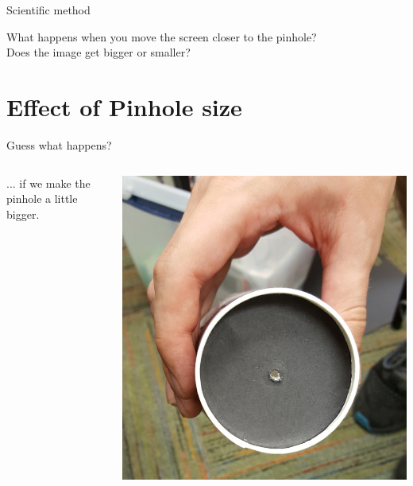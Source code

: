 \begin{frame}[fragile]{Scientific method}
  
\end{frame}

\begin{frame}
  What happens when you move the screen closer to the pinhole?\\
  Does the image get bigger or smaller?
\end{frame}

\section{Effect of Pinhole size}
\begin{frame}{Guess what happens?}
  \begin{columns}
    \begin{column}{0.6\textwidth}
      ... if we make the pinhole a little bigger.
    \end{column}
    \begin{column}{0.4\textwidth}
      \includegraphics[width=\textwidth]{media/bighole.jpg}
    \end{column}
  \end{columns}
\end{frame}

